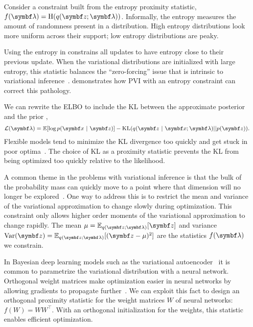  Consider a constraint built from the entropy proximity statistic, $f(\mblambda) = \mathrm{H}(q(\mbz; \mblambda))$. Informally, the entropy measures the amount of randomness present in a distribution.  High entropy distributions look more uniform across their support; low entropy distributions are peaky.

Using the entropy in  constrains all updates to have entropy close to their previous update. When the variational distributions are initialized with large entropy, this statistic balances the ``zero-forcing'' issue that is intrinsic to variational inference~\citep{mackay2003information}.   demonstrates how \gls{PVI} with an entropy constraint can correct this pathology.

 We can rewrite the \gls{ELBO} to
include the \gls{KL} between the approximate posterior and the prior \citep{kingma2014autoencoding},
\begin{align*}
  \cL(\mblambda) =
  \E [ \log p(\mb{x} \mid \mb{z})] - \mathrm{KL}(q(\mbz \mid \mbx; \mblambda) || p(\mbz) ).
\end{align*}
Flexible models tend to minimize the \gls{KL} divergence too quickly and get stuck in poor optima~\citep{DBLP:conf/conll/BowmanVVDJB16}. The choice of \gls{KL} as a proximity statistic prevents the \gls{KL} from being optimized too quickly relative to the likelihood.

 A common theme in the problems with variational inference is that the bulk of the probability mass can quickly move to a point where that dimension will no longer be explored~\citep{Burda2016}. One way to address this is to restrict the mean and variance of the variational approximation to change slowly during optimization. This constraint only allows higher order moments of the variational approximation to change rapidly. The mean $\mu=\E_{q(\mbz; \mblambda)}[\mbz]$ and variance $\textrm{Var}(\mbz) = \E_{q(\mbz; \mblambda)}[(\mbz - \mu)^2]$ are the statistics $f(\mblambda)$ we constrain.

 In Bayesian deep learning models such as the variational autoencoder~\citep{kingma2014autoencoding,rezende2014stochastic} it is common to parametrize the variational distribution with a neural network. Orthogonal weight matrices make optimization easier in neural networks by allowing gradients to propagate further~\citep{saxe2013exact}. We can exploit this fact to design an orthogonal proximity statistic for the weight matrices $W$ of neural networks: $f(W) = WW^\top$. With an orthogonal initialization for the weights, this statistic enables efficient optimization.

